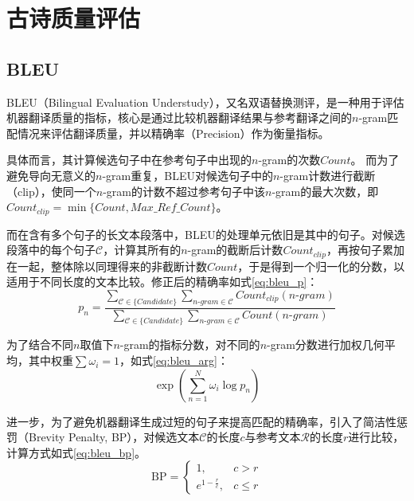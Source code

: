 \section{古诗质量评估}
\subsection{BLEU}
BLEU（Bilingual Evaluation Understudy），又名双语替换测评，是一种用于评估机器翻译质量的指标，核心是通过比较机器翻译结果与参考翻译之间的$n$-gram匹配情况来评估翻译质量，并以精确率（Precision）作为衡量指标。\cite{papineniBLEUMethodAutomatic2002}

具体而言，其计算候选句子中在参考句子中出现的$n$-gram的次数$Count$。
而为了避免导向无意义的$n$-gram重复，BLEU对候选句子中的$n$-gram计数进行截断（clip），使同一个$n$-gram的计数不超过参考句子中该$n$-gram的最大次数，即$Count_{clip}=\min\{Count,Max\_Ref\_Count\}$。

而在含有多个句子的长文本段落中，BLEU的处理单元依旧是其中的句子。对候选段落中的每个句子$\mathcal C$，计算其所有的$n$-gram的截断后计数$Count_{clip}$，再按句子累加在一起，整体除以同理得来的非截断计数$Count$，于是得到一个归一化的分数，以适用于不同长度的文本比较。修正后的精确率如式\eqref{eq:bleu_p}：
\begin{equation}
    p_n=\frac{\sum_{\mathcal C \in\{Candidate\}} \sum_{n\mbox{-}gram\in\mathcal C} Count_{clip}(n\mbox{-}gram)}{\sum_{\mathcal C \in\{Candidate\}} \sum_{n\mbox{-}gram\in\mathcal C} Count(n\mbox{-}gram)} \label{eq:bleu_p}
\end{equation}

为了结合不同$n$取值下$n$-gram的指标分数，对不同的$n$-gram分数进行加权几何平均，其中权重$\sum\omega_i=1$，如式\eqref{eq:bleu_arg}：
\begin{equation}
    \exp\left(\sum^N_{n=1} \omega_i\log p_n\right) \label{eq:bleu_arg}
\end{equation}

进一步，为了避免机器翻译生成过短的句子来提高匹配的精确率，引入了简洁性惩罚（Brevity Penalty, BP），对候选文本$\mathcal C$的长度$c$与参考文本$\mathcal R$的长度$r$进行比较，计算方式如式\eqref{eq:bleu_bp}。
\begin{equation}
    \mathrm{BP}=\left\{
    \begin{array}{lr}
        1, &c>r \\
        e^{1-\frac rc}, & c\leq r
    \end{array}
    \right. 
    \label{eq:bleu_bp}
\end{equation}

